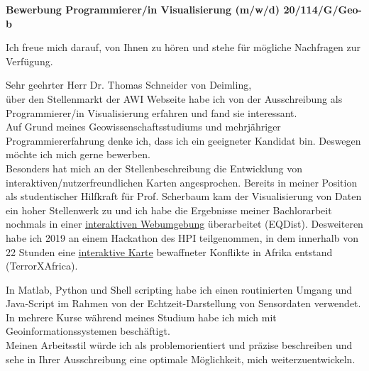 \documentclass[11pt,a4paper,roman]{moderncv}
\begin{document}
\date{\today}
\opening{\textbf{Bewerbung Programmierer/in Visualisierung (m/w/d) 20/114/G/Geo-b}}
\closing{Ich freue mich darauf, von Ihnen zu hören und stehe für mögliche Nachfragen zur Verfügung.}
\makelettertitle


Sehr geehrter Herr Dr. Thomas Schneider von Deimling,\\
über den Stellenmarkt der AWI Webseite habe ich von der Ausschreibung als Programmierer/in Visualisierung erfahren und fand sie interessant.\\ Auf Grund meines Geowissenschaftsstudiums und mehrjähriger Programmiererfahrung denke ich, dass ich ein geeigneter Kandidat bin. Deswegen möchte ich mich gerne bewerben.\\
\vspace{5mm}
Besonders hat mich an der Stellenbeschreibung die Entwicklung von interaktiven/nutzerfreundlichen Karten angesprochen. Bereits in meiner Position als studentischer Hilfkraft für Prof. Scherbaum kam der Visualisierung von Daten ein hoher Stellenwerk zu und ich habe die Ergebnisse meiner Bachlorarbeit nochmals in einer \href{https://earthquake-distances.herokuapp.com/}{\color{pblue}\underline{interaktiven Webumgebung}} überarbeitet (EQDist). Desweiteren habe ich 2019 an einem Hackathon des HPI teilgenommen, in dem innerhalb von 22 Stunden eine \href{https://earthquake-distances.herokuapp.com}{\color{pblue}\underline{interaktive Karte}} bewaffneter Konflikte in Afrika entstand (TerrorXAfrica).\\
\vspace{5mm}

In Matlab, Python und Shell scripting habe ich einen routinierten Umgang und Java-Script im Rahmen von der Echtzeit-Darstellung von Sensordaten verwendet. In mehrere Kurse während
meines Studium habe ich mich mit Geoinformationssystemen beschäftigt.\\
Meinen Arbeitsstil würde ich als problemorientiert und präzise beschreiben und sehe in Ihrer Ausschreibung eine optimale Möglichkeit, mich weiterzuentwickeln.

\vspace{0.5cm}


\makeletterclosing
\end{document}
